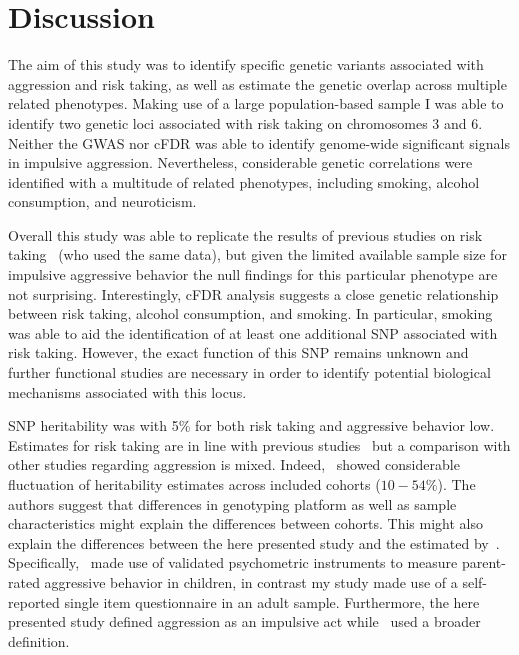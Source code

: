 \section{Discussion}
\label{sec:ukb_assc_discussion}

The aim of this study was to identify specific genetic variants associated with aggression and risk taking,
as well as estimate the genetic overlap across multiple related phenotypes.
Making use of a large population-based sample I was able to identify two genetic loci associated with risk taking on chromosomes 3 and 6.
Neither the GWAS nor cFDR was able to identify genome-wide significant signals in impulsive aggression.
Nevertheless, considerable genetic correlations were identified with a multitude of related phenotypes, including smoking, alcohol consumption, and neuroticism.

Overall this study was able to replicate the results of previous studies on risk taking~\cite{Day2016} (who used the same data), but given the limited available sample size for impulsive aggressive behavior the null findings for this particular phenotype are not surprising.
Interestingly, cFDR analysis suggests a close genetic relationship between risk taking, alcohol consumption, and smoking.
In particular, smoking was able to aid the identification of at least one additional SNP associated with risk taking.
However, the exact function of this SNP remains unknown and further functional studies are necessary in order to identify potential biological mechanisms associated with this locus.

SNP heritability was with 5\% for both risk taking and aggressive behavior low.
Estimates for risk taking are in line with previous studies~\cite{Day2016} but a comparison with other studies regarding aggression is mixed.
Indeed,~\citet{Pappa2016a} showed considerable fluctuation of heritability estimates across included cohorts ($10-54\%$). 
The authors suggest that differences in genotyping platform as well as sample characteristics might explain the differences between cohorts.
This might also explain the differences between the here presented study and the estimated by~\citet{Pappa2016a}.
Specifically,~\citet{Pappa2016a} made use of validated psychometric instruments to measure parent-rated aggressive behavior in children, in contrast my study made use of a self-reported single item questionnaire in an adult sample.
Furthermore, the here presented study defined aggression as an impulsive act while~\citet{Pappa2016a} used a broader definition.

